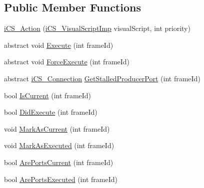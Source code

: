 \subsection*{Public Member Functions}
\begin{DoxyCompactItemize}
\item 
\hyperlink{classi_c_s___action_a4747c57076021dbe5802f740290e22a9}{i\+C\+S\+\_\+\+Action} (\hyperlink{classi_c_s___visual_script_imp}{i\+C\+S\+\_\+\+Visual\+Script\+Imp} visual\+Script, int priority)
\item 
abstract void \hyperlink{classi_c_s___action_a4b463a51d32e0bd065e301ca553d9261}{Execute} (int frame\+Id)
\item 
abstract void \hyperlink{classi_c_s___action_af1cb586e6433b6f1a7cb5fcfd18ca94e}{Force\+Execute} (int frame\+Id)
\item 
abstract \hyperlink{classi_c_s___connection}{i\+C\+S\+\_\+\+Connection} \hyperlink{classi_c_s___action_a4b84305f3956aa96b45fa643f13e7195}{Get\+Stalled\+Producer\+Port} (int frame\+Id)
\item 
bool \hyperlink{classi_c_s___action_a7907aeafa31bdfd68186a597e68fd00f}{Is\+Current} (int frame\+Id)
\item 
bool \hyperlink{classi_c_s___action_adaa411de5c6eb04699c36b8de9f798f5}{Did\+Execute} (int frame\+Id)
\item 
void \hyperlink{classi_c_s___action_a130e3f0cc3de1b13ca86d497da800824}{Mark\+As\+Current} (int frame\+Id)
\item 
void \hyperlink{classi_c_s___action_ac0f062e828daabedfc72a974305024a9}{Mark\+As\+Executed} (int frame\+Id)
\item 
bool \hyperlink{classi_c_s___action_ae491b3db9995fda42e8b90e525542d4a}{Are\+Ports\+Current} (int frame\+Id)
\item 
bool \hyperlink{classi_c_s___action_afdc44531a8b1c2925c69f2bf66786768}{Are\+Ports\+Executed} (int frame\+Id)
\end{DoxyCompactItemize}
